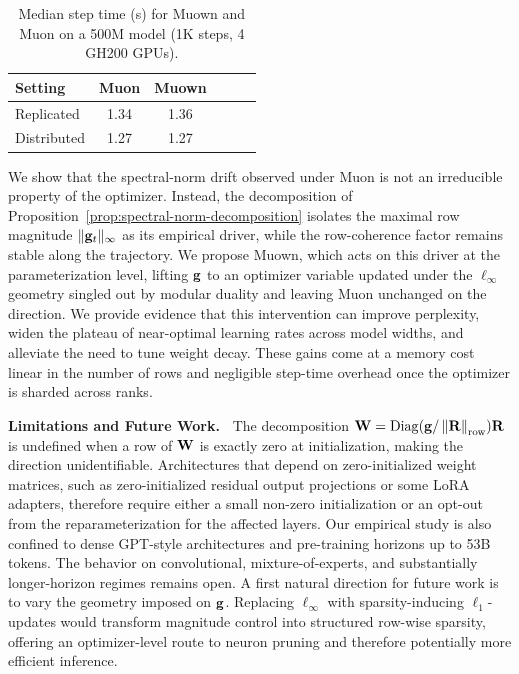 \documentclass{article}
\newcommand{\algname}{Muown}
\begin{document}
\begin{table}
        \vspace{-12pt}
        \centering
        \small
        \setlength{\tabcolsep}{4pt}
        \caption{Median step time (s) for \algname{} and Muon on a 500M model (1K steps, 4 GH200 GPUs). }
        \label{tab:timing-overhead}
        \begin{tabular}{l cc cc c}
            \toprule
            Setting & Muon & \algname{} \\
            \midrule
            Replicated   & 1.34 & 1.36  \\
            Distributed   & 1.27 & 1.27  \\
            \bottomrule
        \end{tabular}%
        \vspace{-10pt}
\end{table} 
We show that the spectral-norm drift observed under Muon is not an irreducible property of the optimizer. Instead, the decomposition of Proposition~\ref{prop:spectral-norm-decomposition} isolates the maximal row magnitude $\|\mathbf{g}_t\|_\infty$ as its empirical driver, while the row-coherence factor remains stable along the trajectory. We propose \algname{}, which acts on this driver at the parameterization level, lifting $\mathbf{g}$ to an optimizer variable updated under the $\ell_\infty$ geometry singled out by modular duality and leaving Muon unchanged on the direction. We provide evidence that this intervention can improve perplexity, widen the plateau of near-optimal learning rates across model widths, and alleviate the need to tune weight decay. These gains come at a memory cost linear in the number of rows and negligible step-time overhead once the optimizer is sharded across ranks. 

\textbf{Limitations and Future Work.\ } The decomposition $\mathbf{W}=\operatorname{Diag}(\mathbf{g}/\left \| \mathbf{R} \right\|_{\mathrm{row}})\mathbf{R}$ is undefined when a row of $\mathbf{W}$ is exactly zero at initialization, making the direction unidentifiable. Architectures that depend on zero-initialized weight matrices, such as zero-initialized residual output projections or some LoRA adapters, therefore require either a small non-zero initialization or an opt-out from the reparameterization for the affected layers. Our empirical study is also confined to dense GPT-style architectures and pre-training horizons up to 53B tokens. The behavior on convolutional, mixture-of-experts, and substantially longer-horizon regimes remains open. A first natural direction for future work is to vary the geometry imposed on $\mathbf{g}$. Replacing $\ell_\infty$ with sparsity-inducing  $\ell_1$-updates would transform magnitude control into structured row-wise sparsity, offering an optimizer-level route to neuron pruning and therefore potentially more efficient inference.  
\end{document}
